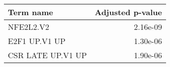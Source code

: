\begin{tabular}{lr}
\toprule
        Term name &  Adjusted p-value \\
\midrule
        NFE2L2.V2 &          2.16e-09 \\
    E2F1 UP.V1 UP &          1.30e-06 \\
CSR LATE UP.V1 UP &          1.90e-06 \\
\bottomrule
\end{tabular}

